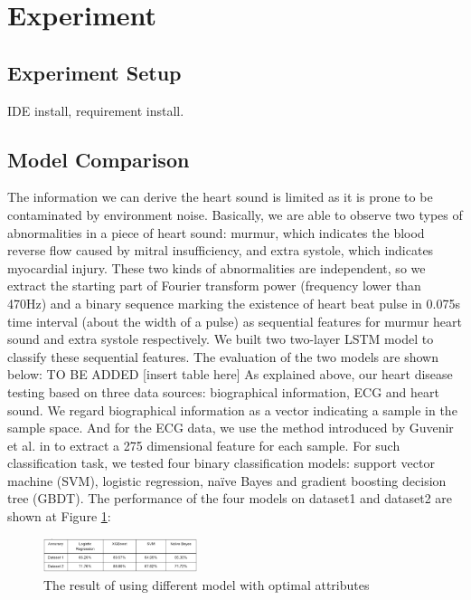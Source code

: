 \documentclass[letterpaper]{article} %
\begin{document}
\section{Experiment}

\subsection{Experiment Setup}

IDE install, requirement install.

\subsection{Model Comparison}

The information we can derive the heart sound is limited as it is prone to be contaminated by environment noise. Basically, we are able to observe two types of abnormalities in a piece of heart sound: murmur, which indicates the blood reverse flow caused by mitral insufficiency, and extra systole, which indicates myocardial injury. These two kinds of abnormalities are independent, so we extract the starting part of Fourier transform power (frequency lower than 470Hz) and a binary sequence marking the existence of heart beat pulse in 0.075s time interval (about the width of a pulse) as sequential features for murmur heart sound and extra systole respectively. We built two two-layer LSTM model to classify these sequential features. The evaluation of the two models are shown below:
TO BE ADDED
[insert table here]
As explained above, our heart disease testing based on three data sources: biographical information, ECG and heart sound.
We regard biographical information as a vector indicating a sample in the sample space. And for the ECG data, we use the method introduced by Guvenir et al. in \cite{ECG} to extract a 275 dimensional feature for each sample.  For such classification task, we tested four binary classification models: support vector machine (SVM), logistic regression, naïve Bayes and gradient boosting decision tree (GBDT). 
The performance of the four models on dataset1 and dataset2 are shown at Figure \ref{fig:dataset-1-comparison}:
\begin{figure}[!htbp]
\centering\includegraphics[width=0.4\textwidth]{dataset-1-comparison}
\caption{The result of using different model with optimal attributes}
\label{fig:dataset-1-comparison}
\end{figure}
\end{document}
